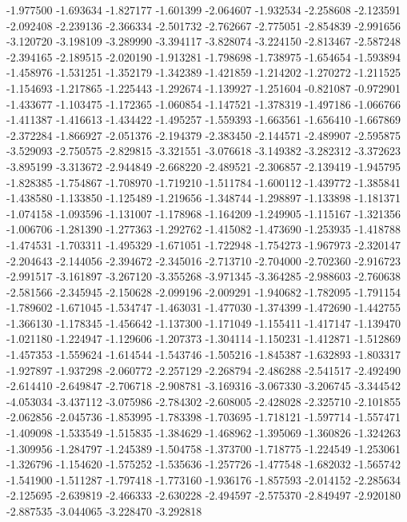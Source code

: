 -1.977500
-1.693634
-1.827177
-1.601399
-2.064607
-1.932534
-2.258608
-2.123591
-2.092408
-2.239136
-2.366334
-2.501732
-2.762667
-2.775051
-2.854839
-2.991656
-3.120720
-3.198109
-3.289990
-3.394117
-3.828074
-3.224150
-2.813467
-2.587248
-2.394165
-2.189515
-2.020190
-1.913281
-1.798698
-1.738975
-1.654654
-1.593894
-1.458976
-1.531251
-1.352179
-1.342389
-1.421859
-1.214202
-1.270272
-1.211525
-1.154693
-1.217865
-1.225443
-1.292674
-1.139927
-1.251604
-0.821087
-0.972901
-1.433677
-1.103475
-1.172365
-1.060854
-1.147521
-1.378319
-1.497186
-1.066766
-1.411387
-1.416613
-1.434422
-1.495257
-1.559393
-1.663561
-1.656410
-1.667869
-2.372284
-1.866927
-2.051376
-2.194379
-2.383450
-2.144571
-2.489907
-2.595875
-3.529093
-2.750575
-2.829815
-3.321551
-3.076618
-3.149382
-3.282312
-3.372623
-3.895199
-3.313672
-2.944849
-2.668220
-2.489521
-2.306857
-2.139419
-1.945795
-1.828385
-1.754867
-1.708970
-1.719210
-1.511784
-1.600112
-1.439772
-1.385841
-1.438580
-1.133850
-1.125489
-1.219656
-1.348744
-1.298897
-1.133898
-1.181371
-1.074158
-1.093596
-1.131007
-1.178968
-1.164209
-1.249905
-1.115167
-1.321356
-1.006706
-1.281390
-1.277363
-1.292762
-1.415082
-1.473690
-1.253935
-1.418788
-1.474531
-1.703311
-1.495329
-1.671051
-1.722948
-1.754273
-1.967973
-2.320147
-2.204643
-2.144056
-2.394672
-2.345016
-2.713710
-2.704000
-2.702360
-2.916723
-2.991517
-3.161897
-3.267120
-3.355268
-3.971345
-3.364285
-2.988603
-2.760638
-2.581566
-2.345945
-2.150628
-2.099196
-2.009291
-1.940682
-1.782095
-1.791154
-1.789602
-1.671045
-1.534747
-1.463031
-1.477030
-1.374399
-1.472690
-1.442755
-1.366130
-1.178345
-1.456642
-1.137300
-1.171049
-1.155411
-1.417147
-1.139470
-1.021180
-1.224947
-1.129606
-1.207373
-1.304114
-1.150231
-1.412871
-1.512869
-1.457353
-1.559624
-1.614544
-1.543746
-1.505216
-1.845387
-1.632893
-1.803317
-1.927897
-1.937298
-2.060772
-2.257129
-2.268794
-2.486288
-2.541517
-2.492490
-2.614410
-2.649847
-2.706718
-2.908781
-3.169316
-3.067330
-3.206745
-3.344542
-4.053034
-3.437112
-3.075986
-2.784302
-2.608005
-2.428028
-2.325710
-2.101855
-2.062856
-2.045736
-1.853995
-1.783398
-1.703695
-1.718121
-1.597714
-1.557471
-1.409098
-1.533549
-1.515835
-1.384629
-1.468962
-1.395069
-1.360826
-1.324263
-1.309956
-1.284797
-1.245389
-1.504758
-1.373700
-1.718775
-1.224549
-1.253061
-1.326796
-1.154620
-1.575252
-1.535636
-1.257726
-1.477548
-1.682032
-1.565742
-1.541900
-1.511287
-1.797418
-1.773160
-1.936176
-1.857593
-2.014152
-2.285634
-2.125695
-2.639819
-2.466333
-2.630228
-2.494597
-2.575370
-2.849497
-2.920180
-2.887535
-3.044065
-3.228470
-3.292818
